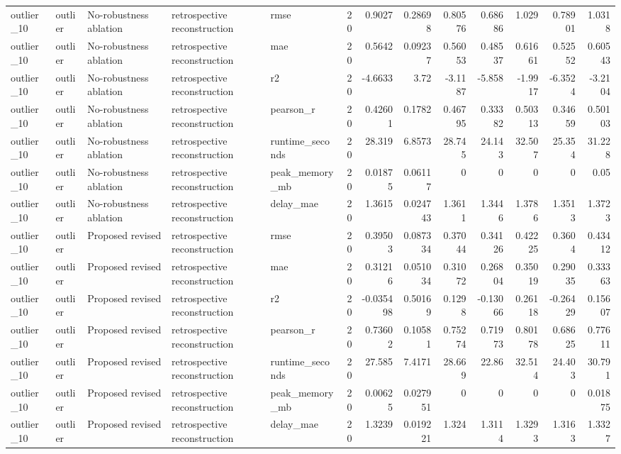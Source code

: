 \begin{table}[!htbp]
{{\begin{tabular}{lllllrrrrrrrr}
outlier_10 & outlier & No-robustness ablation & retrospective reconstruction & rmse & 20 & 0.9027 & 0.28698 & 0.80576 & 0.68686 & 1.029 & 0.78901 & 1.0318 \\
outlier_10 & outlier & No-robustness ablation & retrospective reconstruction & mae & 20 & 0.5642 & 0.09237 & 0.56053 & 0.48537 & 0.61661 & 0.52552 & 0.60543 \\
outlier_10 & outlier & No-robustness ablation & retrospective reconstruction & r2 & 20 & -4.6633 & 3.72 & -3.1187 & -5.858 & -1.9917 & -6.3524 & -3.2104 \\
outlier_10 & outlier & No-robustness ablation & retrospective reconstruction & pearson_r & 20 & 0.42601 & 0.1782 & 0.46795 & 0.33382 & 0.50313 & 0.34659 & 0.50103 \\
outlier_10 & outlier & No-robustness ablation & retrospective reconstruction & runtime_seconds & 20 & 28.319 & 6.8573 & 28.745 & 24.143 & 32.507 & 25.354 & 31.228 \\
outlier_10 & outlier & No-robustness ablation & retrospective reconstruction & peak_memory_mb & 20 & 0.01875 & 0.06117 & 0 & 0 & 0 & 0 & 0.05 \\
outlier_10 & outlier & No-robustness ablation & retrospective reconstruction & delay_mae & 20 & 1.3615 & 0.024743 & 1.3611 & 1.3446 & 1.3786 & 1.3513 & 1.3723 \\
outlier_10 & outlier & Proposed revised & retrospective reconstruction & rmse & 20 & 0.39503 & 0.087334 & 0.37044 & 0.34126 & 0.42225 & 0.3604 & 0.43412 \\
outlier_10 & outlier & Proposed revised & retrospective reconstruction & mae & 20 & 0.31216 & 0.051034 & 0.31072 & 0.26804 & 0.35019 & 0.29035 & 0.33363 \\
outlier_10 & outlier & Proposed revised & retrospective reconstruction & r2 & 20 & -0.035498 & 0.50169 & 0.1298 & -0.13066 & 0.26118 & -0.26429 & 0.15607 \\
outlier_10 & outlier & Proposed revised & retrospective reconstruction & pearson_r & 20 & 0.73602 & 0.10581 & 0.75274 & 0.71973 & 0.80178 & 0.68625 & 0.77611 \\
outlier_10 & outlier & Proposed revised & retrospective reconstruction & runtime_seconds & 20 & 27.585 & 7.4171 & 28.669 & 22.86 & 32.514 & 24.403 & 30.791 \\
outlier_10 & outlier & Proposed revised & retrospective reconstruction & peak_memory_mb & 20 & 0.00625 & 0.027951 & 0 & 0 & 0 & 0 & 0.01875 \\
outlier_10 & outlier & Proposed revised & retrospective reconstruction & delay_mae & 20 & 1.3239 & 0.019221 & 1.324 & 1.3114 & 1.3293 & 1.3163 & 1.3327 \\

\end{tabular}}}
\end{table}
